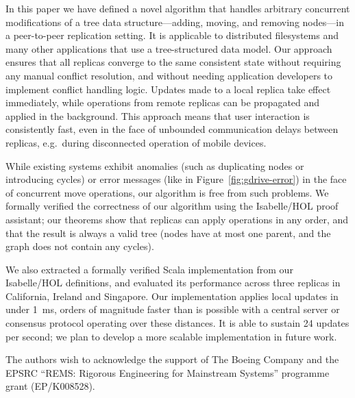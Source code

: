 \documentclass[sigplan,anonymous]{acmart}
\begin{document}
In this paper we have defined a novel algorithm that handles arbitrary concurrent modifications of a tree data structure---adding, moving, and removing nodes---in a peer-to-peer replication setting.
It is applicable to distributed filesystems and many other applications that use a tree-structured data model.
Our approach ensures that all replicas converge to the same consistent state without requiring any manual conflict resolution, and without needing application developers to implement conflict handling logic.
Updates made to a local replica take effect immediately, while operations from remote replicas can be propagated and applied in the background.
This approach means that user interaction is consistently fast, even in the face of unbounded communication delays between replicas, e.g.\ during disconnected operation of mobile devices.

While existing systems exhibit anomalies (such as duplicating nodes or introducing cycles) or error messages (like in Figure~\ref{fig:gdrive-error}) in the face of concurrent move operations, our algorithm is free from such problems.
We formally verified the correctness of our algorithm using the Isabelle/HOL proof assistant; our theorems show that replicas can apply operations in any order, and that the result is always a valid tree (nodes have at most one parent, and the graph does not contain any cycles).

We also extracted a formally verified Scala implementation from our Isabelle/HOL definitions, and evaluated its performance across three replicas in California, Ireland and Singapore.
Our implementation applies local updates in under 1~ms, orders of magnitude faster than is possible with a central server or consensus protocol operating over these distances.
It is able to sustain 24 updates per second; we plan to develop a more scalable implementation in future work.

\begin{acks}
The authors wish to acknowledge the support of The Boeing Company and the EPSRC ``REMS: Rigorous Engineering for Mainstream Systems'' programme grant (EP/K008528).
\end{acks}


{}
\end{document}
